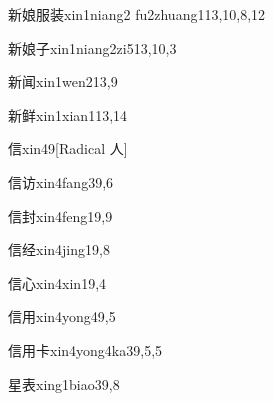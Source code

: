 \begin{verbete}{新娘服装}{xin1niang2 fu2zhuang1}{13,10,8,12}
\end{verbete}

\begin{verbete}{新娘子}{xin1niang2zi5}{13,10,3}
\end{verbete}

\begin{verbete}{新闻}{xin1wen2}{13,9}
\end{verbete}

\begin{verbete}{新鲜}{xin1xian1}{13,14}
\end{verbete}

\begin{verbete}{信}{xin4}{9}[Radical 人]
\end{verbete}

\begin{verbete}{信访}{xin4fang3}{9,6}
\end{verbete}

\begin{verbete}{信封}{xin4feng1}{9,9}
\end{verbete}

\begin{verbete}{信经}{xin4jing1}{9,8}
\end{verbete}

\begin{verbete}{信心}{xin4xin1}{9,4}
\end{verbete}

\begin{verbete}{信用}{xin4yong4}{9,5}
\end{verbete}

\begin{verbete}{信用卡}{xin4yong4ka3}{9,5,5}
\end{verbete}

\begin{verbete}{星表}{xing1biao3}{9,8}
\end{verbete}

